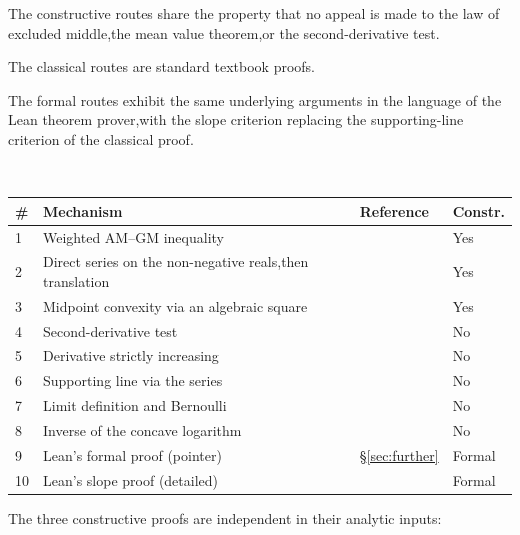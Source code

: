 \documentclass[11pt,reqno]{amsart}
\makeatletter
\theoremstyle{redplain}
\renewenvironment{quotation}
{\list{}{\listparindent\z@
		\itemindent\z@
		\rightmargin\leftmargin
		\parsep\z@}	\item\relax}
{\endlist}
\numberwithin{equation}{section}
\makeatother
\begin{document}
\begin{quotation}
\noindent The constructive routes share the property that no appeal is made
to the law of excluded middle,\thinspace \allowbreak the mean value
theorem,\thinspace \allowbreak or the second-derivative test.

\noindent The classical routes are standard textbook proofs. \noindent

The formal routes exhibit the same underlying arguments in the language of
the Lean theorem prover,\thinspace \allowbreak with the slope criterion
replacing the supporting-line criterion of the classical proof.
\end{quotation}

\begin{center}
{\small \ 
\begin{tabular}{|m{0.8cm}|m{6.5cm}|m{2.3cm}|m{1.5cm}|}
\hline
\textbf{\#} & \textbf{Mechanism} & \textbf{Reference} & \textbf{Constr.} \\ 
\hline
1 & Weighted AM--GM inequality & \Cref{thm:amgm} & Yes \\ \hline
2 & Direct series on the non-negative reals,\thinspace \allowbreak then
translation & \Cref{thm:series-pos,thm:translation} & Yes \\ \hline
3 & Midpoint convexity via an algebraic square & \Cref{thm:midpoint-convex}
& Yes \\ \hline
4 & Second-derivative test & \Cref{thm:second-derivative} & No \\ \hline
5 & Derivative strictly increasing & \Cref{thm:derivative-increasing} & No
\\ \hline
6 & Supporting line via the series & \Cref{thm:supporting-line} & No \\ 
\hline
7 & Limit definition and Bernoulli & \Cref{thm:bernoulli} & No \\ \hline
8 & Inverse of the concave logarithm & \Cref{thm:log-inverse} & No \\ \hline
9 & Lean's formal proof (pointer) & \S \ref{sec:further} & Formal \\ \hline
10 & Lean's slope proof (detailed) & \Cref{thm:exp-strict-convex-lean} & 
Formal \\ \hline
\end{tabular}
}
\end{center}

\begin{quotation}
{ \noindent The three constructive proofs are independent in
their analytic inputs: \medskip }
\end{quotation}
\end{document}
